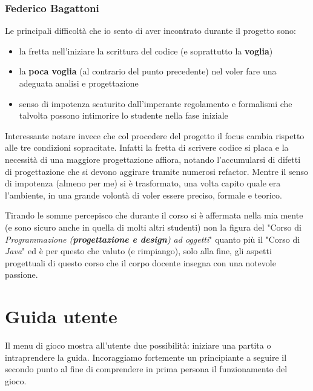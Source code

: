 \documentclass[a4paper,12pt]{report}
\begin{document}
\subsection{Federico Bagattoni}
Le principali difficoltà che io sento di aver incontrato durante il progetto sono: 
\begin{itemize}
    \item la fretta nell'iniziare la scrittura del codice (e soprattutto la \textbf{voglia})
    \item la \textbf{poca voglia} (al contrario del punto precedente) nel voler fare una adeguata analisi e progettazione
    \item senso di impotenza scaturito dall'imperante regolamento e formalismi che talvolta possono intimorire lo studente nella fase iniziale
\end{itemize}
Interessante notare invece che col procedere del progetto il focus cambia rispetto alle tre condizioni sopracitate. Infatti la fretta di scrivere codice si placa e la necessità di una maggiore progettazione affiora, notando l'accumularsi di difetti di progettazione che si devono aggirare tramite numerosi refactor. Mentre il senso di impotenza (almeno per me) si è trasformato, una volta capito quale era l'ambiente, in una grande volontà di voler essere preciso, formale e teorico. 
\par 
Tirando le somme percepisco che durante il corso si è affermata nella mia mente (e sono sicuro anche in quella di molti altri studenti) non la figura del "Corso di \textit{Programmazione (\textbf{progettazione e design}) ad oggetti}" quanto più il "Corso di \textit{Java}" ed è per questo che valuto (e rimpiango), solo alla fine, gli aspetti progettuali di questo corso che il corpo docente insegna con una notevole passione.
\appendix
\chapter{Guida utente}
Il menu di gioco mostra all'utente due possibilità: iniziare una partita o intraprendere la guida. Incoraggiamo fortemente un principiante a seguire il secondo punto al fine di comprendere in prima persona il funzionamento del gioco.
\end{document}
